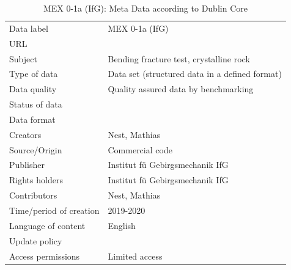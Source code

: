 \begin{table}[!ht]
\caption{MEX 0-1a (IfG): Meta Data according to Dublin Core}
\label{tab:dms-mex0-1a-ifg}
\small
\begin{tabular}{R{3.5cm}|L{7.5cm}}
\hline
%
Data label & MEX 0-1a (IfG) \\
URL &  \\ 
Subject  & Bending fracture test, crystalline rock \\
Type of data  & Data set (structured data in a defined format) \\
Data quality  & Quality assured data by benchmarking \\
Status of data  &  \\
Data format  &  \\
Creators  & Nest, Mathias  \\
Source/Origin & Commercial code \\
Publisher  & Institut f\"u Gebirgsmechanik IfG \\
Rights holders & Institut f\"u Gebirgsmechanik IfG \\
Contributors & Nest, Mathias \\
Time/period of creation & 2019-2020 \\
Language of content & English \\
Update policy &  \\
Access permissions & Limited access \\
%
\hline
\end{tabular}
\end{table}